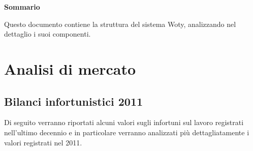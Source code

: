 
\newpage

\vspace*{0.5cm} %
\begin{center}

\textbf{{\huge{Sommario}}}

Questo documento contiene la struttura del sistema Woty, analizzando nel dettaglio i suoi componenti.

\vspace*{0.2cm} %

\end{center}






\newpage

\tableofcontents %

\let\cleardoublepage\clearpage %

\listoftables

\listoffigures




\newpage
\chapter{Analisi di mercato}



\section{Bilanci infortunistici 2011}
Di seguito verranno riportati alcuni valori sugli infortuni sul lavoro registrati nell'ultimo decennio e in particolare verranno analizzati più dettagliatamente i valori registrati nel 2011.

